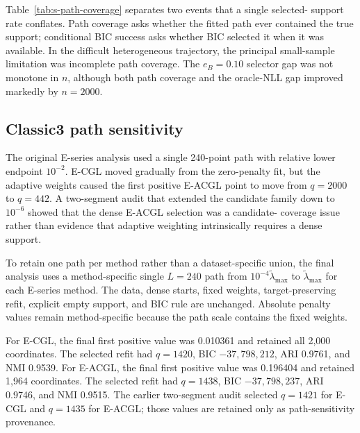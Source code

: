 \documentclass[preprint,12pt,authoryear]{elsarticle}
\begin{document}
Table~\ref{tab:s-path-coverage} separates two events that a single selected-
support rate conflates. Path coverage asks whether the fitted path ever
contained the true support; conditional BIC success asks whether BIC selected
it when it was available. In the difficult heterogeneous trajectory, the
principal small-sample limitation was incomplete path coverage. The
$e_B=0.10$ selector gap was not monotone in $n$, although both path coverage
and the oracle-NLL gap improved markedly by $n=2000$.



\subsection{Classic3 path sensitivity}

The original E-series analysis used a single 240-point path with relative
lower endpoint $10^{-2}$. E-CGL moved gradually from the zero-penalty fit, but
the adaptive weights caused the first positive E-ACGL point to move from
$q=2000$ to $q=442$. A two-segment audit that extended the candidate family
down to $10^{-6}$ showed that the dense E-ACGL selection was a candidate-
coverage issue rather than evidence that adaptive weighting intrinsically
requires a dense support.

To retain one path per method rather than a dataset-specific union, the final
analysis uses a method-specific single $L=240$ path from
$10^{-4}\widetilde\lambda_{\max}$ to $\widetilde\lambda_{\max}$ for each
E-series method. The data, dense starts,
fixed weights, target-preserving refit, explicit empty support, and BIC rule
are unchanged. Absolute penalty values remain method-specific because the
path scale contains the fixed weights.

For E-CGL, the final first positive value was 0.010361 and retained all 2,000
coordinates. The selected refit had $q=1420$, BIC $-37{,}798{,}212$, ARI
0.9761, and NMI 0.9539. For E-ACGL, the final first positive value was 0.196404
and retained 1,964 coordinates. The selected refit had $q=1438$, BIC
$-37{,}798{,}237$, ARI 0.9746, and NMI 0.9515. The earlier two-segment audit
selected $q=1421$ for E-CGL and $q=1435$ for E-ACGL; those values are retained
only as path-sensitivity provenance.
\end{document}
